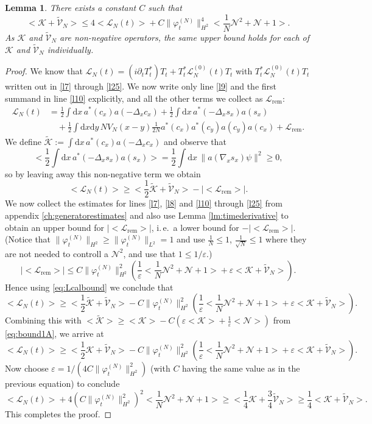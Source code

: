 \documentclass[11pt,a4paper,DIV11]{scrartcl}	%
\newtheorem{lem}[thm]{Lemma}
\newcommand{\di}{\textrm{d}}		%
\newcommand{\Lcal}{\mathcal{L}}		%
\newcommand{\Ncal}{\mathcal{N}}		%
\newcommand{\Kcal}{\mathcal{K}}		%
\newcommand{\tilV}{\tilde{\mathcal{V}}_N}		%
\newcommand{\tilK}{\tilde{\mathcal{K}}}		%
\newcommand{\norm}[1]{\lVert#1\rVert}	%
\newcommand{\ev}[1]{\big<#1\big>}	%
\newcommand{\ph}{\varphi_t^{(N)}}	%
\newcommand{\be}[1]{\begin{equation}\label{eq:#1}}	%
\newcommand{\ee}{\end{equation}}
\newcommand{\bd}{\begin{displaymath}}			%
\newcommand{\ed}{\end{displaymath}}
\newcommand{\eqr}[1]{\eqref{eq:#1}}			%
\begin{document}
\begin{lem}
\label{lem:kvbounds}
There exists a constant $C$ such that
\bd
\ev{\Kcal + \tilV} \leq 4 \ev{\Lcal_N(t)} + C \norm{\ph}_{H^2}^4 \ev{\frac{1}{N}\Ncal^2 + \Ncal + 1}.
\ed
As $\Kcal$ and $\tilV$ are non-negative operators, the same upper bound holds for each of $\Kcal$ and $\tilV$ individually.
\end{lem}
\begin{proof}
We know that $\Lcal_N(t) = (i\partial_t T^\ast_t)T_t + T^\ast_t
\Lcal_N^{(0)}(t)T_t$ with $T^\ast_t \Lcal_N^{(0)}(t)T_t$ written out in
\eqref{l7} through \eqref{l25}. We now write only line \eqref{l9} and the
first summand in line \eqref{l10} explicitly, and all the other terms we collect as $\Lcal_{\textrm{rem}}$:
\begin{align*}
\Lcal_N(t) & = \frac{1}{2} \int \di x\, a^\ast(c_x) a(-\Delta_x c_x) + \frac{1}{2}\int \di x\, a^\ast(-\Delta_x s_x)a(s_x) \\
& \quad + \frac{1}{2}\int \di x\di y\, NV_N(x-y) \frac{1}{2N} a^\ast(c_x) a^\ast(c_y) a(c_y) a(c_x) + \Lcal_{\textrm{rem}}.
\end{align*}
We define $\tilK := \int \di x\, a^\ast(c_x) a(-\Delta_x c_x)$ and observe that
\bd
\ev{\frac{1}{2}\int \di x\, a^\ast(-\Delta_x s_x)a(s_x)} = \frac{1}{2}\int \di x\, \norm{a(\nabla_x s_x)\psi}^2 \geq 0,
\ed
so by leaving away this non-negative term we obtain
\be{Lcalbound}
\ev{\Lcal_N(t)} \geq \ev{\frac{1}{2}\tilK + \tilV} - \lvert\ev{\Lcal_{\textrm{rem}}}\rvert.
\ee
We now collect the estimates for lines \eqref{l7}, \eqref{l8} and \eqref{l10} through \eqref{l25} from appendix \ref{ch:generatorestimates} and also use Lemma \ref{lm:timederivative} to obtain an upper bound for $\lvert\ev{\Lcal_{\textrm{rem}}}\rvert$, i.\,e.\ a lower bound for $-\lvert\ev{\Lcal_{\textrm{rem}}}\rvert$.
(Notice that $\norm{\ph}_{H^2} \geq \norm{\ph}_{L^2} =1$ and use $\frac{1}{N} \leq 1$, $\frac{1}{\sqrt{N}} \leq 1$ where they are not needed to controll a $\Ncal^2$, and use that $1 \leq 1/\varepsilon$.)
\bd
\lvert\ev{\Lcal_{\textrm{rem}}}\rvert \leq C \norm{\ph}_{H^2}^2 \left( \frac{1}{\varepsilon}\ev{\frac{1}{N}\Ncal^2 + \Ncal + 1} + \varepsilon\ev{\Kcal+\tilV} \right).
\ed
Hence using \eqr{Lcalbound} we conclude that
\bd
\ev{\Lcal_N(t)} \geq \ev{\frac{1}{2}\tilK+\tilV} - C\norm{\ph}_{H^2}^2 \left( \frac{1}{\varepsilon}\ev{\frac{1}{N}\Ncal^2 +\Ncal+1} + \varepsilon \ev{\Kcal+\tilV} \right).
\ed
Combining this with $\ev{\tilK} \geq \ev{\Kcal} - C\left(\varepsilon\ev{\Kcal} + \frac{1}{\varepsilon}\ev{\Ncal} \right)$ from \eqref{eq:bound1A}, we arrive at
\bd
\ev{\Lcal_N(t)} \geq  \ev{\frac{1}{2}\Kcal+\tilV} - C\norm{\ph}_{H^2}^2 \left( \frac{1}{\varepsilon}\ev{\frac{1}{N}\Ncal^2 +\Ncal+1} + \varepsilon \ev{\Kcal+\tilV} \right).
\ed
Now choose $\varepsilon = 1/(4C\norm{\ph}_{H^2}^2)$ (with $C$ having the same value as in the previous equation) to conclude
\bd
\ev{\Lcal_N(t)} + 4\left( C \norm{\ph}_{H^2}^2 \right)^2
\ev{\frac{1}{N}\Ncal^2 + \Ncal + 1} \geq
\ev{\frac{1}{4}\Kcal+\frac{3}{4}\tilV} \geq \frac{1}{4} \ev{\Kcal + \tilV}.
\ed
This completes the proof.
\end{proof}
\end{document}
